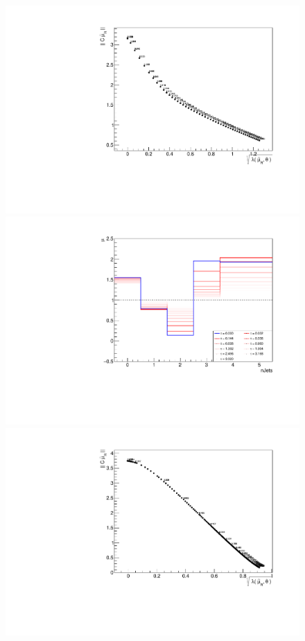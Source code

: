 \begin{figure}[ht]
 \begin{center}
   \includegraphics[width=\halflinewidth]{img/differentials/regularization/Lshape.pdf}
   \includegraphics[width=\halflinewidth]{img/differentials/regularization/SeveralUnfoldedSpectra.pdf}
   \\[-10pt]
   \includegraphics[width=\halflinewidth]{img/differentials/regularization/seed7003_Lshape.pdf}

\end{center}
\end{figure}
